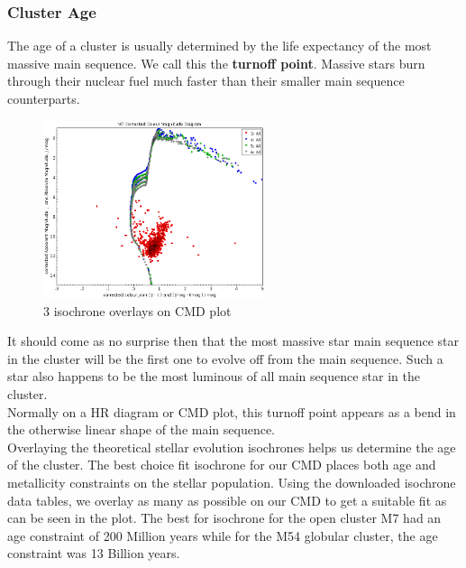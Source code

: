 \documentclass[12pt]{article}
\begin{document}
		\subsubsection{Cluster Age}
		The age of a cluster is usually determined by the life expectancy of the most massive main sequence. We call this the \textbf{turnoff point}. Massive stars burn through their nuclear fuel much faster than their smaller main sequence counterparts.
		\begin{figure}
			\includegraphics[width=0.58\textwidth, keepaspectratio]{m7_cmd_all_fits}
			\caption{3 isochrone overlays on CMD plot}
			\label{fig: m7_cmd_all_fits}
		\end{figure}
		It should come as no surprise then that the most massive star main sequence star in the cluster will be the first one to evolve off from the main sequence. Such a star also happens to be the most luminous of all main sequence star in the cluster.\\
		Normally on a HR diagram or CMD plot, this turnoff point appears as a bend in the otherwise linear shape of the main sequence.\\
		Overlaying the theoretical stellar evolution isochrones helps us determine the age of the cluster. The best choice fit isochrone for our CMD places both age and metallicity constraints on the stellar population. Using the downloaded isochrone data tables, we overlay as many as possible on our CMD to get a suitable fit as can be seen in the plot. The best for isochrone for the open cluster M7 had an age constraint of 200 Million years while for the M54 globular cluster, the age constraint was 13 Billion years.
		
	
\end{document}
